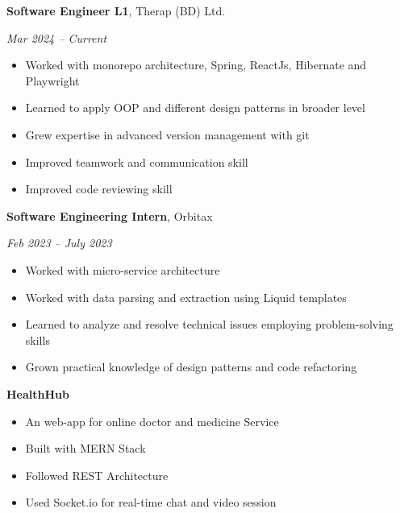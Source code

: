 \documentclass[10pt,a4paper,ragged2e]{altacv}
\begin{document}
\begin{large}
	\textbf{Software Engineer L1}, Therap (BD) Ltd. \href{https://therapbd.com/}{\faExternalLink}\newline
	\begin{small}
		{\textit{Mar 2024 -- Current}}
	\end{small}
	\smallskip\smallskip
\end{large}
\begin{itemize}
	\item Worked with monorepo architecture, Spring, ReactJs, \newline Hibernate and Playwright
	\item Learned to apply OOP and different design patterns in \newline broader level
	\item Grew expertise in advanced version management with git
	\item Improved teamwork and communication skill
	\item Improved code reviewing skill
\end{itemize}
\smallskip
\begin{large}
	\textbf{Software Engineering Intern}, Orbitax \href{https://orbitax.com/}{\faExternalLink}\newline
	\begin{small}
		{\textit{Feb 2023 -- July 2023}}
	\end{small}
	\smallskip\smallskip
\end{large}
\begin{itemize}
	\item Worked with micro-service architecture
	\item Worked with data parsing and extraction using Liquid \newline templates
	\item Learned to analyze and resolve technical issues employing problem-solving skills
	\item Grown practical knowledge of design patterns and code \newline refactoring
\end{itemize}
\smallskip

\begin{large}
	\textbf{HealthHub} \href{https://github.com/nihalshahria/Health-Hub}{\faExternalLink}\smallskip\smallskip
\end{large}
\begin{itemize}
	\item An web-app for online doctor and medicine Service
	\item Built with MERN Stack
	\item Followed REST Architecture
	\item Used Socket.io for real-time chat and video session
\end{itemize}\smallskip\smallskip
    
\end{document}
